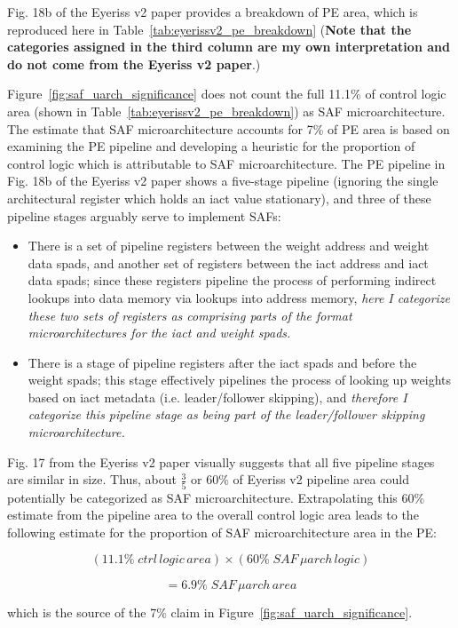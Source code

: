 Fig. 18b of the Eyeriss v2 paper\cite{eyerissv2} provides a breakdown of PE area, which is reproduced here in Table~\ref{tab:eyerissv2_pe_breakdown} (\textbf{Note that the categories assigned in the third column are my own interpretation and do not come from the Eyeriss v2 paper}.)

Figure~\ref{fig:saf_uarch_significance} does not count the full 11.1\% of control logic area (shown in Table~\ref{tab:eyerissv2_pe_breakdown}) as SAF microarchitecture. The estimate that SAF microarchitecture accounts for 7\% of PE area is based on examining the PE pipeline and developing a heuristic for the proportion of control logic which is attributable to SAF microarchitecture. The PE pipeline in Fig. 18b of the Eyeriss v2 paper\cite{eyerissv2} shows a five-stage pipeline (ignoring the single architectural register which holds an iact value stationary), and three of these pipeline stages arguably serve to implement SAFs: 

\begin{itemize}
    \item There is a set of pipeline registers between the weight address and weight data spads, and another set of registers between the iact address and iact data spads; since these registers pipeline the process of performing indirect lookups into data memory via lookups into address memory, \textit{here I categorize these two sets of registers as comprising parts of the format microarchitectures for the iact and weight spads.}
    
    \item There is a stage of pipeline registers after the iact spads and before the weight spads; this stage effectively pipelines the process of looking up weights based on iact metadata (i.e. leader/follower skipping), and \textit{therefore I categorize this pipeline stage as being part of the leader/follower skipping microarchitecture.}
\end{itemize}

Fig. 17 from the Eyeriss v2 paper visually suggests that all five pipeline stages are similar in size. Thus, about $\frac{3}{5}$ or 60\% of Eyeriss v2 pipeline area could potentially be categorized as SAF microarchitecture. Extrapolating this 60\% estimate from the pipeline area to the overall control logic area leads to the following estimate for the proportion of SAF microarchitecture area in the PE:

\[(11.1\%\;ctrl\,logic\,area)\times(60\%\;SAF\,\mu arch\,logic)\]

\[ = 6.9\%\; SAF\,\mu arch\,area\]


which is the source of the 7\% claim in Figure~\ref{fig:saf_uarch_significance}. 
\clearpage
\newpage

